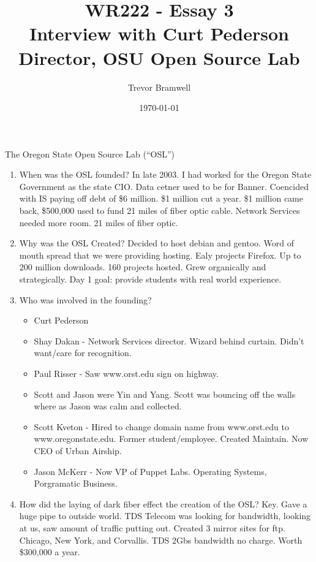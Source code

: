 \documentclass[12pt]{article}
\title{WR222 - Essay 3\\
    Interview with Curt Pederson\\ 
    Director, OSU Open Source Lab
}
\author{
    Trevor Bramwell \\
}
\date{\today}
\begin{document}
\maketitle

The Oregon State Open Source Lab (``OSL'')

\begin{enumerate} 
    \item When was the OSL founded?
        In late 2003. I had worked for the Oregon State Government as the state CIO.
        Data cetner used to be for Banner. Coencided with IS paying off debt of \$6 million.
        \$1 million cut a year. \$1 million came back, \$500,000 used to fund 21 miles of fiber optic
        cable. Network Services needed more room.
        21 miles of fiber optic. 
    \item Why was the OSL Created?
        Decided to host debian and gentoo. Word of mouth spread that we were providing hosting.
        Ealy projects Firefox. Up to 200 million downloads. 160 projects hosted. Grew organically
        and strategically. Day 1 goal: provide students with real world experience.
    \item Who was involved in the founding?
        \begin{itemize}
        \item Curt Pederson
        \item Shay Dakan - Network Services director.
            Wizard behind curtain. Didn't want/care for recognition.
        \item Paul Risser - Saw www.orst.edu sign on highway.
        \item Scott and Jason were Yin and Yang. Scott was bouncing off the walls where as Jason was
        calm and collected.
        \item Scott Kveton - Hired to change domain name from www.orst.edu
            to www.oregonstate.edu.
            Former student/employee. Created Maintain. Now CEO of Urban 
            Airship.
        \item Jason McKerr - Now VP of Puppet Labs. Operating Systems, 
            Porgramatic Business.
        \end{itemize}
    \item How did the laying of dark fiber effect the creation of the OSL?
        Key. Gave a huge pipe to outside world. TDS Telecom was looking for 
        bandwidth,
        looking at us, saw amount of traffic putting out. Created 3 mirror sites for ftp.
        Chicago, New York, and Corvallis. TDS 2Gbs bandwidth no charge. Worth \$300,000 a year.

\end{enumerate}
\end{document}
